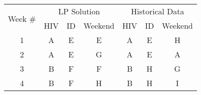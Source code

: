 \begin{table}[h]
 	\centering
 	\begin{adjustbox}{scale=0.8}
	    \begin{tabular}{c||ccc||ccc}
	    	\multicolumn{1}{c||}{\multirow{2}[1]{*}{Week \#}} & \multicolumn{3}{c||}{LP Solution}                                                                                                                                       & \multicolumn{3}{c}{Historical Data}                                                                                                                                     \\
	    	                                                  &                  HIV                  &                                 ID                                 &                              Weekend                               &                  HIV                  &                                 ID                                 &                              Weekend                               \\ \midrule\midrule
	    	                        1                         & \cellcolor[rgb]{ .663,  .816,  .557}A &                \cellcolor[rgb]{ .957,  .69,  .518}E                &                \cellcolor[rgb]{ .957,  .69,  .518}E                & \cellcolor[rgb]{ .663,  .816,  .557}A &                \cellcolor[rgb]{ .957,  .69,  .518}E                &               \cellcolor[rgb]{ .459,  .443,  .443}H                \\
	    	                        2                         & \cellcolor[rgb]{ .663,  .816,  .557}A &                \cellcolor[rgb]{ .957,  .69,  .518}E                &                \cellcolor[rgb]{ .518,  .592,  .69}G                & \cellcolor[rgb]{ .663,  .816,  .557}A &                \cellcolor[rgb]{ .957,  .69,  .518}E                &               \cellcolor[rgb]{ .663,  .816,  .557}A                \\
	    	                        3                         & \cellcolor[rgb]{ .608,  .761,  .902}B &               \cellcolor[rgb]{ .557,  .663,  .859}F                &               \cellcolor[rgb]{ .557,  .663,  .859}F                & \cellcolor[rgb]{ .608,  .761,  .902}B &               \cellcolor[rgb]{ .459,  .443,  .443}H                &                \cellcolor[rgb]{ .518,  .592,  .69}G                \\
	    	                        4                         & \cellcolor[rgb]{ .608,  .761,  .902}B &               \cellcolor[rgb]{ .557,  .663,  .859}F                &               \cellcolor[rgb]{ .459,  .443,  .443}H                & \cellcolor[rgb]{ .608,  .761,  .902}B &               \cellcolor[rgb]{ .459,  .443,  .443}H                & \cellcolor[rgb]{ .251,  .251,  .251}\textcolor[rgb]{ 1,  1,  1}{I} \\

\end{tabular}
\end{adjustbox}
\end{table}
